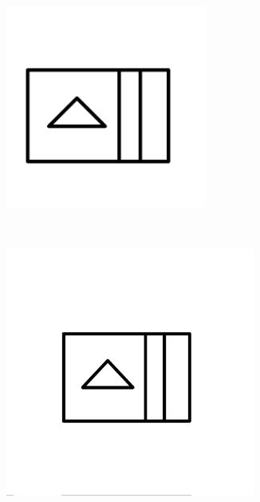     \begin{figure}[h]
        \centering
                \begin{subfigure}[b]{0.2\textwidth}
                \centering
                \includegraphics[width=0.73\textwidth]{figures/Results/Scaling/Model.png}
                \caption{}
        \end{subfigure}\\
                \begin{subfigure}[b]{0.25\textwidth}
                \centering
                \includegraphics[width=0.9\textwidth]{figures/Results/Scaling/1.png}

\end{subfigure}
\end{figure}
